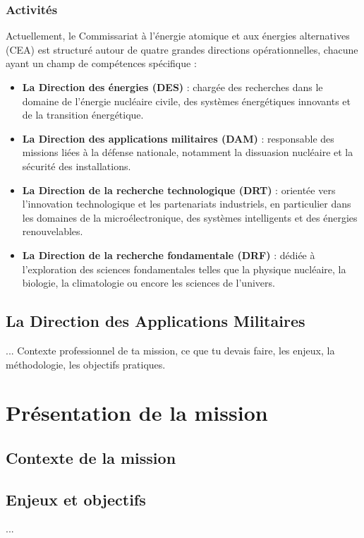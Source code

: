 \documentclass[12pt,a4paper]{report}
\begin{document}
\subsection{Activités}
Actuellement, le Commissariat à l’énergie atomique et aux énergies alternatives (CEA) est structuré autour de quatre grandes directions opérationnelles, chacune ayant un champ de compétences spécifique :

\begin{itemize}
  \item \textbf{La Direction des énergies (DES)} : chargée des recherches dans le domaine de l’énergie nucléaire civile, des systèmes énergétiques innovants et de la transition énergétique.

  \item \textbf{La Direction des applications militaires (DAM)} : responsable des missions liées à la défense nationale, notamment la dissuasion nucléaire et la sécurité des installations.

  \item \textbf{La Direction de la recherche technologique (DRT)} : orientée vers l’innovation technologique et les partenariats industriels, en particulier dans les domaines de la microélectronique, des systèmes intelligents et des énergies renouvelables.

  \item \textbf{La Direction de la recherche fondamentale (DRF)} : dédiée à l’exploration des sciences fondamentales telles que la physique nucléaire, la biologie, la climatologie ou encore les sciences de l’univers.
\end{itemize}


\section{La Direction des Applications Militaires}
... %
Contexte professionnel de ta mission, ce que tu devais faire, les enjeux, la méthodologie, les objectifs pratiques.


\chapter{Présentation de la mission}
\section{Contexte de la mission}
\section{Enjeux et objectifs}
... %
\end{document}
